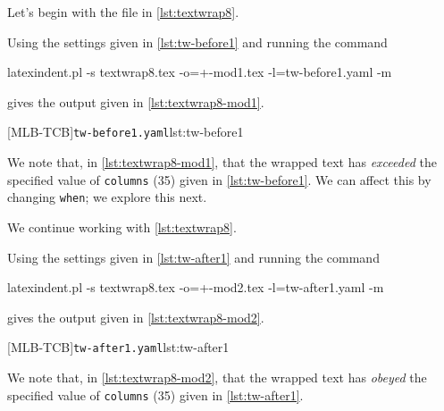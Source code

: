  \begin{example}
 Let's begin with the file in \cref{lst:textwrap8}.


 Using the settings given in \cref{lst:tw-before1} and running the command

 \begin{commandshell}
latexindent.pl -s textwrap8.tex -o=+-mod1.tex -l=tw-before1.yaml -m
   \end{commandshell}

 gives the output given in \cref{lst:textwrap8-mod1}.

 \begin{cmhtcbraster}
  [MLB-TCB]{\texttt{tw-before1.yaml}}{lst:tw-before1}
 \end{cmhtcbraster}

 We note that, in \cref{lst:textwrap8-mod1}, that the wrapped text has \emph{exceeded}
 the specified value of \texttt{columns} (35) given in \cref{lst:tw-before1}. We can
 affect this by changing \texttt{when}; we explore this next.
 \end{example}

 \begin{example}
 We continue working with \cref{lst:textwrap8}.

 Using the settings given in \cref{lst:tw-after1} and running the command

 \begin{commandshell}
latexindent.pl -s textwrap8.tex -o=+-mod2.tex -l=tw-after1.yaml -m
   \end{commandshell}

 gives the output given in \cref{lst:textwrap8-mod2}.

 \begin{cmhtcbraster}
  [MLB-TCB]{\texttt{tw-after1.yaml}}{lst:tw-after1}
 \end{cmhtcbraster}

 We note that, in \cref{lst:textwrap8-mod2}, that the wrapped text has \emph{obeyed} the
 specified value of \texttt{columns} (35) given in \cref{lst:tw-after1}.
 \end{example}

